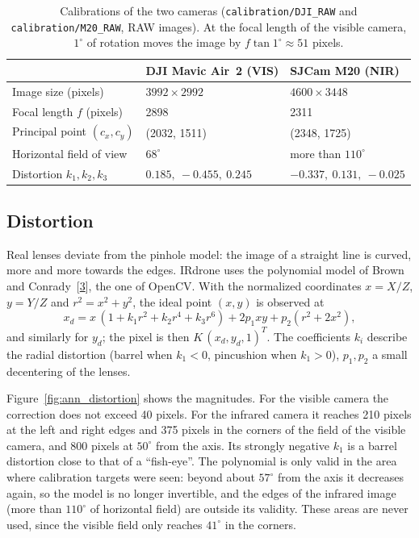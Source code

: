 \documentclass[a4paper,11pt]{report}
\begin{document}
\begin{table}[htbp]\centering
\begin{tabular}{@{}lll@{}}
\hline
 & \textbf{DJI Mavic Air~2 (VIS)} & \textbf{SJCam M20 (NIR)} \\ \hline
Image size (pixels) & $3992 \times 2992$ & $4600 \times 3448$ \\
Focal length $f$ (pixels) & 2898 & 2311 \\
Principal point $(c_x, c_y)$ & (2032, 1511) & (2348, 1725) \\
Horizontal field of view & $68^\circ$ & more than $110^\circ$ \\
Distortion $k_1, k_2, k_3$ & $0.185,\ -0.455,\ 0.245$ & $-0.337,\ 0.131,\ -0.025$ \\ \hline
\end{tabular}
\caption{Calibrations of the two cameras (\texttt{calibration/DJI\_RAW} and \texttt{calibration/M20\_RAW}, RAW images). At the focal length of the visible camera, $1^\circ$ of rotation moves the image by $f \tan 1^\circ \approx 51$ pixels.}
\label{tab:ann_calib}
\end{table}

\subsection{Distortion}\label{sec:ann_distortion}
Real lenses deviate from the pinhole model: the image of a straight line is curved, more and more towards the edges. IRdrone uses the polynomial model of Brown and Conrady~[\hyperref[ann_brown]{3}], the one of OpenCV. With the normalized coordinates $x = X/Z$, $y = Y/Z$ and $r^2 = x^2 + y^2$, the ideal point $(x, y)$ is observed at
\begin{equation}\label{eq:ann_distortion}
	x_d = x\,(1 + k_1 r^2 + k_2 r^4 + k_3 r^6) + 2p_1 xy + p_2 (r^2 + 2x^2),
\end{equation}
and similarly for $y_d$; the pixel is then $K\,(x_d, y_d, 1)^T$. The coefficients $k_i$ describe the radial distortion (barrel when $k_1 < 0$, pincushion when $k_1 > 0$), $p_1, p_2$ a small decentering of the lenses.

Figure~\ref{fig:ann_distortion} shows the magnitudes. For the visible camera the correction does not exceed 40 pixels. For the infrared camera it reaches 210 pixels at the left and right edges and 375 pixels in the corners of the field of the visible camera, and 800 pixels at $50^\circ$ from the axis. Its strongly negative $k_1$ is a barrel distortion close to that of a ``fish-eye''. The polynomial is only valid in the area where calibration targets were seen: beyond about $57^\circ$ from the axis it decreases again, so the model is no longer invertible, and the edges of the infrared image (more than $110^\circ$ of horizontal field) are outside its validity. These areas are never used, since the visible field only reaches $41^\circ$ in the corners.
\end{document}
